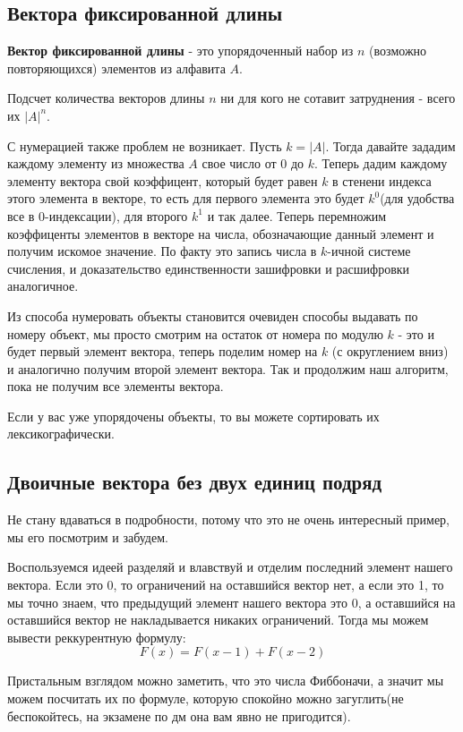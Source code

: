\documentclass{article}
\begin{document}
\subsection{Вектора фиксированной длины}
\textbf{Вектор фиксированной длины} - это упорядоченный набор из $n$ (возможно повторяющихся) элементов из алфавита $A$. 

Подсчет количества векторов длины $n$ ни для кого не сотавит затруднения - всего их $|A|^n$.

С нумерацией также проблем не возникает. Пусть $k = |A|$. Тогда давайте зададим каждому элементу из множества $A$ свое число от 0 до $k$. Теперь дадим каждому элементу вектора свой коэффицент, который будет равен $k$ в стенени индекса этого элемента в векторе, то есть для первого элемента это будет $k^0$(для удобства все в 0-индексации), для второго $k^1$ и так далее. Теперь перемножим коэффиценты элементов в векторе на числа, обозначающие данный элемент и получим искомое значение. По факту это запись числа в $k$-ичной системе счисления, и доказательство единственности зашифровки и расшифровки аналогичное.

Из способа нумеровать объекты становится очевиден способы выдавать по номеру объект, мы просто смотрим на остаток от номера по модулю $k$ - это и будет первый элемент вектора, теперь поделим номер на $k$ (с округлением вниз) и аналогично получим второй элемент вектора. Так и продолжим наш алгоритм, пока не получим все элементы вектора.

Если у вас уже упорядочены объекты, то вы можете сортировать их лексикографически.

\subsection{Двоичные вектора без двух единиц подряд}
Не стану вдаваться в подробности, потому что это не очень интересный пример, мы его посмотрим и забудем.

Воспользуемся идеей разделяй и влавствуй и отделим последний элемент нашего вектора. Если это 0, то ограничений на оставшийся вектор нет, а если это 1, то мы точно знаем, что предыдущий элемент нашего вектора это 0, а оставшийся на оставшийся вектор не накладывается никаких ограничений. Тогда мы можем вывести реккурентную формулу: $$F(x) = F(x-1)+F(x-2)$$

Пристальным взглядом можно заметить, что это числа Фиббоначи, а значит мы можем посчитать их по формуле, которую спокойно можно загуглить(не беспокойтесь, на экзамене по дм она вам явно не пригодится).
\end{document}
